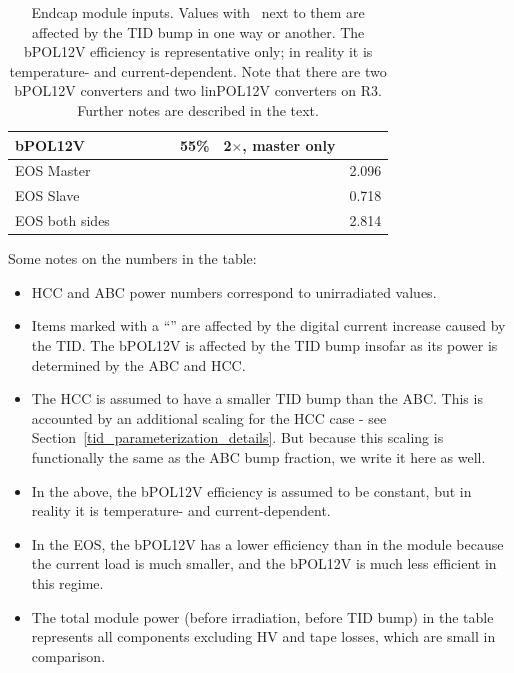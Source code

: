 \begin{table}[h!]
\begin{center}
{\begin{tabular}{|l|c|c|c|c|c|c|c|}
bPOL12V       &               &                     &  &                             & 55\%  & 2$\times$, master only         & \color{blue}{0.633+0.633} \\ \hline
EOS Master    &               &                     &  &                             &       &                     & 2.096 \\
EOS Slave     &               &                     &  &                             &       &                     & 0.718 \\
EOS both sides&               &                     &  &                             &       &                     & 2.814 \\
\hline \end{tabular}
} %
\end{center}
\caption{Endcap module inputs.
Values with \tid~next to them are affected by the TID bump in one way or another. The bPOL12V efficiency
is representative only; in reality it is temperature- and current-dependent.
Note that there are two bPOL12V converters and two linPOL12V converters on R3.
Further notes are
described in the text.
}
\label{tab:power_numbers}
\end{table}
\let\arraystretch\arraystretcha

Some notes on the numbers in the table:
\begin{itemize}
\item HCC and ABC power numbers correspond to unirradiated values.
\item Items marked with a ``\tid'' are affected by the digital current increase caused by the TID.
The bPOL12V is affected by the TID bump insofar as its power is determined by the ABC and HCC.
\item The HCC is assumed to have a smaller TID bump than the ABC. This is accounted by an additional
scaling for the HCC case - see Section~\ref{tid_parameterization_details}. But because this scaling
is functionally the same as the ABC bump fraction, we write it here as well.
\item In the above, the bPOL12V efficiency is assumed to be constant, but in reality it is temperature- and
current-dependent.
\item In the EOS, the bPOL12V has a lower efficiency than in the module because the current load is
much smaller, and the bPOL12V is much less efficient in this regime.
\item The total module power (before irradiation, before TID bump) in the table represents
all components excluding HV and tape losses, which are small in comparison.
\end{itemize}


